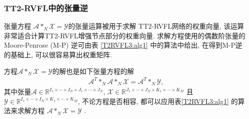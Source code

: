 \subsubsection{TT2-RVFL中的张量逆} \label{Trapezoidsection5-1}
张量方程 $\mathcal A *_N \mathcal X = \mathcal Y$的张量运算被用于求解 TT2-RVFL网络的权重向量,  该运算非常适合计算TT2-RVFL增强节点部分的权重向量.
求解方程使用的偶数阶张量的 Moore-Penrose (M-P) 逆可由表 \ref{T2RVFL3:alg1} 中的算法中给出, 在得到M-P逆的基础上, 可以很容易算出权重矩阵.
\begin{remark}
    方程$\mathcal A *_N \mathcal X = \mathcal Y$的解也是如下张量方程的解
\begin{align}
    \mathcal A^T *_N\mathcal  A *_N \mathcal X = \mathcal A^T *_N \mathcal Y,
\end{align}
其中张量$\mathcal A \in \mathbb R^{I_1\times \cdots\times I_N\times J_1\times \cdots\times J_N} $, $\mathcal X \in \mathbb R^{J_1\times \cdots\times J_N\times K_1\times \cdots\times K_M} $
且 $\mathcal Y \in \mathbb R^{I_1\times \cdots\times I_N\times K_1\times \cdots\times K_M}$,
不论方程是否相容, 都可以应用表\ref{T2RVFL3:alg1} 的算法来求解方程 $\mathcal  A *_N \mathcal X = \mathcal Y$ \cite{HuangZhao2019-9577}.
\end{remark}
